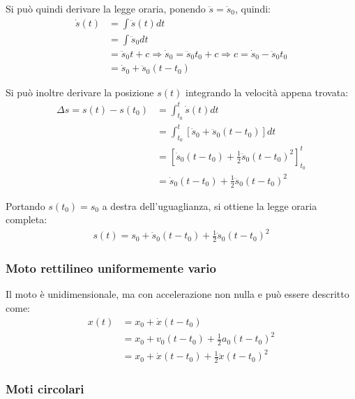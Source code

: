 \documentclass[11pt, a4paper, openright]{book}
\theoremstyle{plain}
\theoremstyle{definition}
\begin{document}
Si può quindi derivare la legge oraria, ponendo $\ddot{s} = \ddot{s}_0$, quindi:
\begin{align}
    \dot{s}(t) & = \int \ddot{s}(t)dt \\
        & = \int \ddot{s}_0dt \\
        & = \ddot{s}_0t + c \Rightarrow \dot{s}_0 = \ddot{s}_0t_0 + c \Rightarrow c = \dot{s}_0 - \ddot{s}_0t_0 \\
        & = \dot{s}_0 + \ddot{s}_0(t - t_0)
\end{align}

Si può inoltre derivare la posizione $s(t)$ integrando la velocità appena trovata:
\begin{align}
    \Delta s = s(t) - s(t_0) & = \int_{t_0}^{t} \dot{s}(t)dt \\
        & = \int_{t_0}^{t} \left[ \dot{s}_0 + \ddot{s}_0(t - t_0) \right] dt \\
        & = \left[ \dot{s}_0(t - t_0) + \frac{1}{2}\ddot{s}_0(t - t_0)^2 \right]_{t_0}^{t} \\
        & = \dot{s}_0(t - t_0) + \frac{1}{2}\ddot{s}_0(t - t_0)^2
\end{align}

Portando $s(t_0) = s_0$ a destra dell'uguaglianza, si ottiene la legge oraria completa:
\begin{align}
    s(t) = s_0 + \dot{s}_0(t - t_0) + \frac{1}{2}\ddot{s}_0(t - t_0)^2
\end{align}

\subsubsection{Moto rettilineo uniformemente vario}
Il moto è unidimensionale, ma con accelerazione non nulla e può essere descritto come:
\begin{align}
    x(t) & = x_0 + \dot{x}(t - t_0) \\
    & = x_0 + v_0(t - t_0) + \frac{1}{2}a_0(t-t_0)^2 \\
    & = x_0 + \dot{x}(t - t_0) + \frac{1}{2}\ddot{x}(t-t_0)^2
\end{align}


\subsubsection{Moti circolari}
\end{document}
